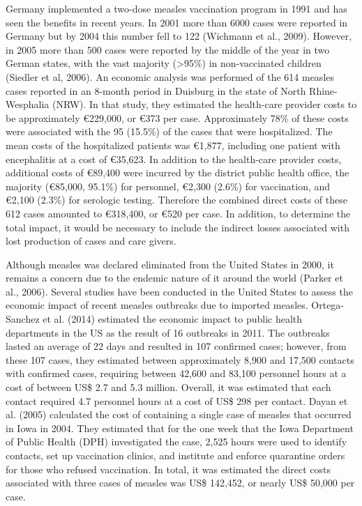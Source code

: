\documentclass{article}
\begin{document}
Germany implemented a two-dose measles vaccination program in 1991 and has seen the benefits in recent years. In 2001 more than 6000 cases were reported in Germany but by 2004 this number fell to 122 (Wichmann et al., 2009). However, in 2005 more than 500 cases were reported by the middle of the year in two German states, with the vast majority (>95\%) in non-vaccinated children (Siedler et al, 2006). An economic analysis was performed of the 614 measles cases reported in an 8-month period in Duisburg in the state of North Rhine-Wesphalia (NRW). In that study, they estimated the health-care provider costs to be approximately \euro 229,000, or \euro 373 per case. Approximately 78\% of these costs were associated with the 95 (15.5\%) of the cases that were hospitalized. The mean costs of the hospitalized patients was  \euro 1,877, including one patient with encephalitis at a cost of \euro 35,623. In addition to the health-care provider costs, additional costs of \euro 89,400 were incurred by the district public health office, the majority (\euro 85,000, 95.1\%) for personnel, \euro 2,300 (2.6\%) for vaccination, and \euro 2,100 (2.3\%) for serologic testing. Therefore the combined direct costs of these 612 cases amounted to \euro 318,400, or \euro 520 per case. In addition, to determine the total impact, it would be necessary to include the indirect losses associated with lost production of cases and care givers.

Although measles was declared eliminated from the United States in 2000, it remains a concern due to the endemic nature of it around the world (Parker et al., 2006). Several studies have been conducted in the United States to assess the economic impact of recent measles outbreaks due to imported measles.  Ortega-Sanchez et al. (2014) estimated the economic impact to public health departments in the US as the result of 16 outbreaks in 2011. The outbreaks lasted an average of 22 days and resulted in 107 confirmed cases; however, from these 107 cases, they estimated between approximately 8,900 and 17,500 contacts with confirmed cases, requiring between 42,600 and 83,100 personnel hours at a cost of between US\$ 2.7 and 5.3 million. Overall, it was estimated that each contact required 4.7 personnel hours at a cost of US\$ 298 per contact.
Dayan et al. (2005) calculated the cost of containing a single case of measles that occurred in Iowa in 2004. They estimated that for the one week that the Iowa Department of Public Health (DPH) investigated the case, 2,525 hours were used to identify contacts, set up vaccination clinics, and institute and enforce quarantine orders for those who refused vaccination. In total, it was estimated the direct costs associated with three cases of measles was US\$ 142,452, or nearly US\$ 50,000 per case.
\end{document}
